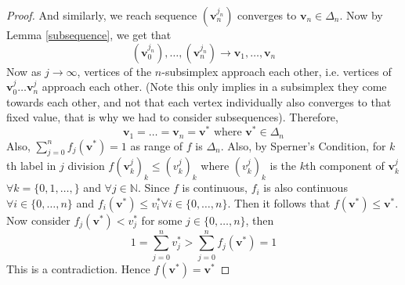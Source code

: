 \documentclass{article}
\theoremstyle{definition}
\begin{document}
\begin{proof}
And similarly, we reach sequence $(\mathbf{v}^{j_n}_n)$ converges to $\mathbf{v}_n\in \Delta_n$. Now by Lemma \ref{subsequence}, we get that $$(\mathbf{v}^{j_n}_0),\dots ,(\mathbf{v}^{j_n}_n) \rightarrow \mathbf{v}_1, \dots ,\mathbf{v}_n$$
Now as $j\rightarrow \infty$, vertices of the $n$-subsimplex approach each other, i.e. vertices of $\mathbf{v}^j_0 \dots \mathbf{v}^j_n$ approach each other. (Note this only implies in a subsimplex they come towards each other, and not that each vertex individually also converges to that fixed value, that is why we had to consider subsequences).  Therefore, $$\mathbf{v}_1 = \dots = \mathbf{v}_n = \mathbf{v}^* \text{ where } \mathbf{v}^*\in \Delta_n$$
Also, $\sum_{j=0}^n f_j(\mathbf{v}^*) = 1$ as range of $f$ is $\Delta_n$. Also, by Sperner's Condition, for $k$th label in $j$ division $f(\mathbf{v}^j_k)_k\leq (v^j_k)_k$ where $(v^j_k)_k$ is the $k$th component of $\mathbf{v}^j_k$ $\forall k = \{0,1,\dots,\}$ and $\forall j\in \mathbb{N}$. Since $f$ is continuous, $f_i$ is also continuous $\forall i \in \{0,\dots, n\}$ and $f_i(\mathbf{v}^*) \leq v^*_i \forall i\in \{0,\dots, n\}$. Then it follows that $f(\mathbf{v^*})\leq \mathbf{v^*}$. Now consider $f_j(\mathbf{v}^*) < v^*_j$ for some $j \in \{0,\dots, n\}$, then
$$ 1 =\sum_{j=0}^n v^*_j > \sum_{j=0}^n f_j(\mathbf{v}^*) = 1$$
This is a contradiction. Hence $f(\mathbf{v}^*) = \mathbf{v}^*$
\end{proof}
\end{document}
